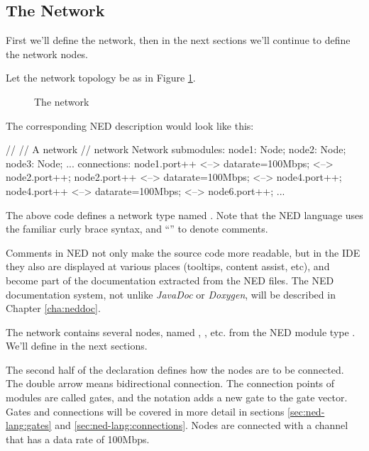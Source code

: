 \subsection{The Network}
\label{sec:ned-lang:warmup:network}

First we'll define the network, then in the next sections we'll continue
to define the network nodes.

Let the network topology be as in Figure \ref{fig:ned-routing-topology}.

\begin{figure}[htbp]
  \begin{center}
    \caption{The network}
    \label{fig:ned-routing-topology}
  \end{center}
\end{figure}

The corresponding NED description would look like this:

\begin{ned}
//
// A network
//
network Network
{
    submodules:
        node1: Node;
        node2: Node;
        node3: Node;
        ...
    connections:
        node1.port++ <--> {datarate=100Mbps;} <--> node2.port++;
        node2.port++ <--> {datarate=100Mbps;} <--> node4.port++;
        node4.port++ <--> {datarate=100Mbps;} <--> node6.port++;
        ...
}
\end{ned}

The above code defines a network type named . Note that the NED
language uses the familiar curly brace syntax, and ``\ttt{//}'' to denote
comments.

\begin{note}
    Comments in NED not only make the source code more readable, but in the
    {\opp} IDE they also are displayed at various places (tooltips, content
    assist, etc), and become part of the documentation extracted from the NED
    files. The NED documentation system, not unlike \textit{JavaDoc} or
    \textit{Doxygen}, will be described in Chapter \ref{cha:neddoc}.
\end{note}

The network contains several nodes, named , , etc.
from the NED module type . We'll define  in the next
sections.

The second half of the declaration defines how the nodes are to be
connected. The double arrow means bidirectional connection. The connection
points of modules are called gates, and the  notation adds a
new gate to the  gate vector. Gates and connections will be
covered in more detail in sections \ref{sec:ned-lang:gates} and
\ref{sec:ned-lang:connections}. Nodes are connected with a channel that
has a data rate of 100Mbps.

